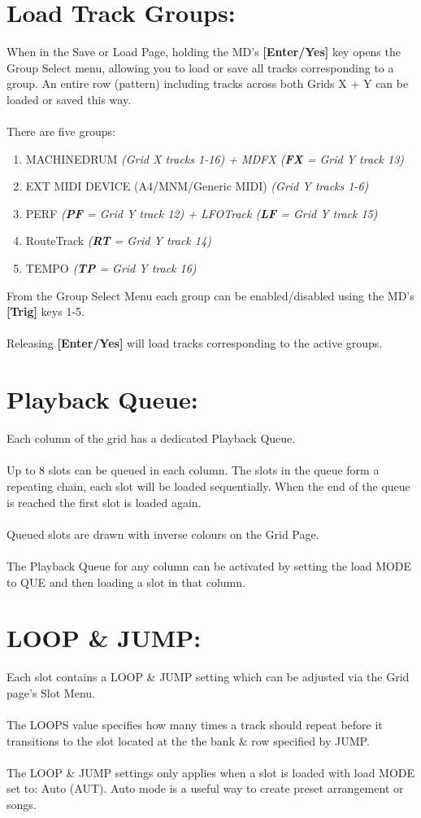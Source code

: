 \section{Load Track Groups:}
When in the Save or Load Page, holding the MD's \textbf{[Enter/Yes]} key opens the Group Select menu, allowing you to load or save all tracks corresponding to a group. An entire row (pattern) including tracks across both Grids X + Y can be loaded or saved this way.\\\\
There are five groups:
\begin{enumerate}
    \item MACHINEDRUM \textit{(Grid X tracks 1-16) + MDFX (\textbf{FX} = Grid Y track 13)}
    \item EXT MIDI DEVICE (A4/MNM/Generic MIDI) \textit{(Grid Y tracks 1-6)}
    \item PERF \textit{(\textbf{PF} = Grid Y track 12) + LFOTrack (\textbf{LF }= Grid Y track 15) }
    \item  RouteTrack \textit{(\textbf{RT} = Grid Y track 14) }
    \item TEMPO \textit{(\textbf{TP} = Grid Y track 16)}
\end{enumerate}
From the Group Select Menu each group can be enabled/disabled using the MD's \textbf{[Trig]} keys 1-5. \\
\\
Releasing \textbf{[Enter/Yes]} will load tracks corresponding to the active groups.

\section{Playback Queue:}
Each column of the grid has a dedicated Playback Queue.\\\\Up to 8 slots can be queued in each column.  The slots in the queue form a repeating chain, each slot will be loaded sequentially. When the end of the queue is reached the first slot is loaded again.\\\\Queued slots are drawn with inverse colours on the Grid Page.\\\\The Playback Queue for any column can be activated by setting the load MODE to QUE and then loading a slot in that column.

\section{LOOP \& JUMP:}
Each slot contains a LOOP \& JUMP setting which can be adjusted via the Grid page's Slot Menu.\\\\The LOOPS value specifies how many times a track should repeat before it transitions to the slot located at the the bank \& row specified by JUMP.
\\\\The LOOP \& JUMP settings only applies when a slot is loaded with load MODE set to: Auto (AUT). Auto mode is a useful way to create preset arrangement or songs.

